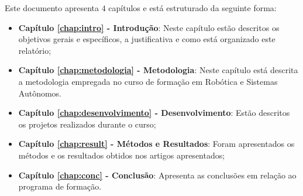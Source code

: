 Este documento apresenta $4$ capítulos e está estruturado da seguinte forma:

\begin{itemize}

  \item \textbf{Capítulo \ref{chap:intro} - Introdução}: Neste capítulo estão descritos os objetivos gerais e específicos, a justificativa e como está organizado este relatório;
  \item \textbf{Capítulo \ref{chap:metodologia} - Metodologia}: Neste capítulo está descrita a metodologia empregada no curso de formação em Robótica e Sistemas Autônomos. 
  \item \textbf{Capítulo \ref{chap:desenvolvimento} - Desenvolvimento}: Estão descritos os projetos realizados durante o curso;
  \item \textbf{Capítulo \ref{chap:result} - Métodos e Resultados}: Foram apresentados os métodos e os resultados obtidos nos artigos apresentados;
  \item \textbf{Capítulo \ref{chap:conc} - Conclusão}: Apresenta as conclusões em relação ao programa de formação.

\end{itemize}